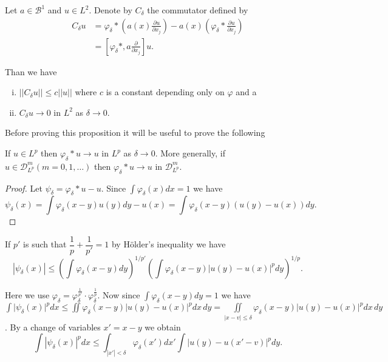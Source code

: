 \begin{proposition}[Friedrichs]\label{chap3-sec1-prop2} %
 Let $a \in \mathscr{B}^1$ and $u \in L^2$. Denote by
 $C_\delta $ the commutator defined by  
\begin{align}
C_\delta u & = \varphi_\delta  *  \left(a(x)\frac{\partial u}{\partial
  x_j}\right)- a(x) \left(\varphi_\delta  *  \frac{\partial
  u}{\partial x_j}\right)\\  
& = \left[\varphi_\delta *,  a \frac{\partial}{\partial x_j}\right]
u. \tag{1.3} \label{chap3-eq1.3}
\end{align}
\end{proposition}

Than we have 
\begin{enumerate}[(i)]
\item $||C_\delta u || \leq c|| u || $ where $c$ is a constant
  depending only on $\varphi $ and a  

\item $C_\delta u \to 0$ in $L^2$ as $\delta \to 0$. 
\end{enumerate}

Before proving this proposition it will be useful to prove the
following 

\setcounter{lemma}{0}
\begin{lemma}\label{chap3-sec1-lem1}%
If $u \in L^p$ then $\varphi_\delta * u \to u$ in $L^p $ as
$\delta \to 0$. More generally,  if $u \in \mathscr{D}^m_{L^p}
(m=0, 1, \ldots )$ then $\varphi_\delta * u \to u$ in
$\mathscr{D}^m_{L^p}$.  
\end{lemma}

\begin{proof}
Let $\psi_\delta = \varphi_\delta * u-u$. Since $\int \varphi_\delta
(x) dx =1$ we have 
$$
\psi_{\delta}(x)= \int \varphi_\delta (x-y) u (y) dy- u(x)= \int
\varphi_\delta (x-y)(u(y)- u(x))dy.
$$  
\end{proof}

If $p'$ is such that $\dfrac{1}{p}+ \dfrac{1}{p'} = 1$ by H\"older's
inequality we have 
$$
| \psi_\delta (x) | \leq \left(\int \varphi_\delta
(x-y)dy\right)^{1/p'} \left(\int \varphi_\delta (x-y) \big| u(y)-u(x)
\big|^p dy\right)^{1/p}.  
$$

Here we use $\varphi_\delta
=\varphi^{\frac{1}{p'}}_\delta \cdot \varphi^{\frac{1}{p}}_\delta$. Now
since $\int \varphi_\delta (x-y)dy =1$ we have $\int \big|\psi_\delta
(x) \big|^p dx \leq \iint \varphi_\delta (x-y)| u(y)-u(x)|^p dx \, dy=
\iint\limits_{|x-v| \leq \delta} \varphi_\delta (x-y)| u(y)-u(x)|^p dx
\, dy$. 
By a change of variables $x'= x-y$ we obtain 
$$
\int |\psi_\delta (x)|^p
dx \leq \int_{|x'| < \delta} \varphi_\delta (x') dx' \int
|u(y)-u(x'-v)|^p dy.
$$\pageoriginale 

